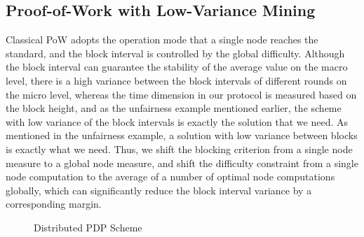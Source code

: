 \documentclass[journal]{IEEEtran}
\begin{document}
\subsection{Proof-of-Work with Low-Variance Mining}
Classical PoW\cite{2008bitcoin} adopts the operation mode that a single node reaches the standard, and the block interval is controlled by the global difficulty. Although the block interval can guarantee the stability of the average value on the macro level, there is a high variance between the block intervals of different rounds on the micro level, whereas the time dimension in our protocol is measured based on the block height, and as the unfairness example mentioned earlier, the scheme with low variance of the block intervals is exactly the solution that we need. As mentioned in the unfairness example, a solution with low variance between blocks is exactly what we need. Thus, we shift the blocking criterion from a single node measure to a global node measure, and shift the difficulty constraint from a single node computation to the average of a number of optimal node computations globally, which can significantly reduce the block interval variance\cite{2020bobtail} by a corresponding margin.


\begin{figure}[htbp]
    \centering
    \caption{Distributed PDP Scheme}
    \label{fig:Bobtail} 
\end{figure}
\end{document}
